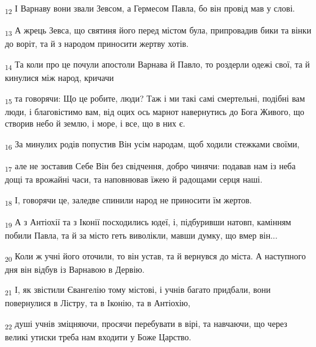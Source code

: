 \begin{tcolorbox}
\textsubscript{12} І Варнаву вони звали Зевсом, а Гермесом Павла, бо він провід мав у слові.
\end{tcolorbox}
\begin{tcolorbox}
\textsubscript{13} А жрець Зевса, що святиня його перед містом була, припровадив бики та вінки до воріт, та й з народом приносити жертву хотів.
\end{tcolorbox}
\begin{tcolorbox}
\textsubscript{14} Та коли про це почули апостоли Варнава й Павло, то роздерли одежі свої, та й кинулися між народ, кричачи
\end{tcolorbox}
\begin{tcolorbox}
\textsubscript{15} та говорячи: Що це робите, люди? Таж і ми такі самі смертельні, подібні вам люди, і благовістимо вам, від оцих ось марнот навернутись до Бога Живого, що створив небо й землю, і море, і все, що в них є.
\end{tcolorbox}
\begin{tcolorbox}
\textsubscript{16} За минулих родів попустив Він усім народам, щоб ходили стежками своїми,
\end{tcolorbox}
\begin{tcolorbox}
\textsubscript{17} але не зоставив Себе Він без свідчення, добро чинячи: подавав нам із неба дощі та врожайні часи, та наповнював їжею й радощами серця наші.
\end{tcolorbox}
\begin{tcolorbox}
\textsubscript{18} І, говорячи це, заледве спинили народ не приносити їм жертов.
\end{tcolorbox}
\begin{tcolorbox}
\textsubscript{19} А з Антіохії та з Іконії посходились юдеї, і, підбуривши натовп, камінням побили Павла, та й за місто геть виволікли, мавши думку, що вмер він...
\end{tcolorbox}
\begin{tcolorbox}
\textsubscript{20} Коли ж учні його оточили, то він устав, та й вернувся до міста. А наступного дня він відбув із Варнавою в Дервію.
\end{tcolorbox}
\begin{tcolorbox}
\textsubscript{21} І, як звістили Євангелію тому містові, і учнів багато придбали, вони повернулися в Лістру, та в Іконію, та в Антіохію,
\end{tcolorbox}
\begin{tcolorbox}
\textsubscript{22} душі учнів зміцняючи, просячи перебувати в вірі, та навчаючи, що через великі утиски треба нам входити у Боже Царство.
\end{tcolorbox}
